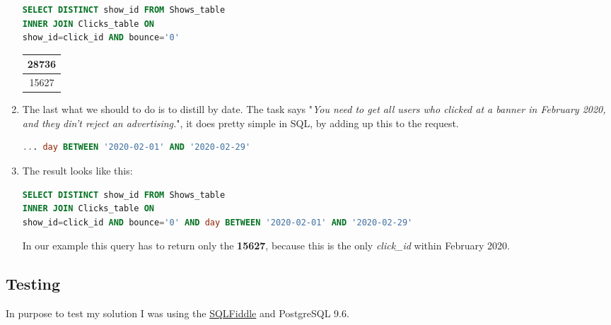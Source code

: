 \documentclass[14pt, a4paper]{extarticle}
\begin{document}
\begin{enumerate}
\begin{lstlisting}[language=SQL]
SELECT DISTINCT show_id FROM Shows_table
INNER JOIN Clicks_table ON
show_id=click_id AND bounce='0' 
\end{lstlisting}

\begin{tabular}{|c|}
    \hline
    28736 \\ \hline
    15627 \\ \hline
\end{tabular}

\item The last what we should to do is to distill by date.
The task says "\emph{You need to get all users who clicked at a banner in February 2020, and 
they din't reject an advertising.}", it does pretty simple in SQL, by adding up this to the request.

\begin{lstlisting}[language=SQL]
... day BETWEEN '2020-02-01' AND '2020-02-29'
\end{lstlisting}

\item The result looks like this:

\begin{lstlisting}[language=SQL]
SELECT DISTINCT show_id FROM Shows_table
INNER JOIN Clicks_table ON
show_id=click_id AND bounce='0' AND day BETWEEN '2020-02-01' AND '2020-02-29'
\end{lstlisting}

In our example this query has to return only the \textbf{15627}, 
because this is the only \emph{click\_id} within February 2020.

\end{enumerate}

\subsection*{Testing}
In purpose to test my solution I was using the \href{http://sqlfiddle.com/}{SQLFiddle} and PostgreSQL 9.6.
\end{document}
